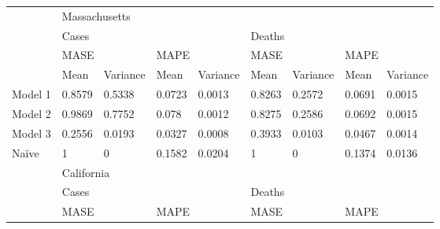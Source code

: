 \begin{table}[h]
\begin{tabular}{|l|llll|llll|}
\hline
        & \multicolumn{8}{l|}{Massachusetts}                                                                                                                                                                   \\ 
\cline{2-9}
        & \multicolumn{4}{l|}{Cases}                                                                       & \multicolumn{4}{l|}{Deaths}                                                                       \\ 
\cline{2-9}
        & \multicolumn{2}{l|}{MASE}                                 & \multicolumn{2}{l|}{MAPE}            & \multicolumn{2}{l|}{MASE}                                 & \multicolumn{2}{l|}{MAPE}             \\ 
\cline{2-9}
        & \multicolumn{1}{l|}{Mean} & \multicolumn{1}{l|}{Variance} & \multicolumn{1}{l|}{Mean} & Variance & \multicolumn{1}{l|}{Mean} & \multicolumn{1}{l|}{Variance} & \multicolumn{1}{l|}{Mean} & Variance  \\ 
\hline
Model 1 & 0.8579                    & 0.5338                        & 0.0723                    & 0.0013   & 0.8263                    & 0.2572                        & 0.0691                    & 0.0015    \\
Model 2 & 0.9869                    & 0.7752                        & 0.078                     & 0.0012   & 0.8275                    & 0.2586                        & 0.0692                    & 0.0015    \\
Model 3 & 0.2556                    & 0.0193                        & 0.0327                    & 0.0008   & 0.3933                    & 0.0103                        & 0.0467                    & 0.0014    \\
Na\"ive   & 1                         & 0                             & 0.1582                    & 0.0204   & 1                         & 0                             & 0.1374                    & 0.0136    \\ 
\hline
        & \multicolumn{8}{l|}{California}                                                                                                                                                                      \\ 
\cline{2-9}
        & \multicolumn{4}{l|}{Cases}                                                                       & \multicolumn{4}{l|}{Deaths}                                                                       \\ 
\cline{2-9}
        & \multicolumn{2}{l|}{MASE}                                 & \multicolumn{2}{l|}{MAPE}            & \multicolumn{2}{l|}{MASE}                                 & \multicolumn{2}{l|}{MAPE}             \\ 

\end{tabular}
\end{table}
